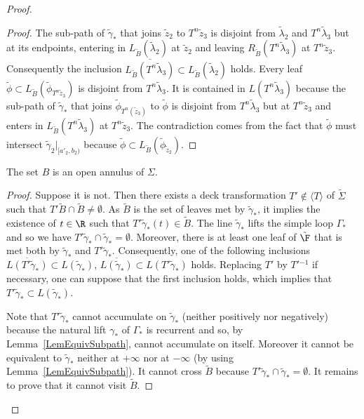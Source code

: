 \begin{proof}
\begin{proof}
The sub-path of $\tilde\gamma_*$ that joins $\tilde z_2$ to $T^n\tilde z_3$ is disjoint from $\tilde\lambda_2$ and $T^n\tilde\lambda_3$ but at its endpoints, entering in $L_{\tilde B}(\tilde\lambda_2)$ at $\tilde z_2$ and leaving $R_{\tilde B}(T^n\tilde\lambda_3)$ at $T^n\tilde z_3$. Consequently the inclusion $\overline{L_{\tilde B}(T^n\tilde\lambda_3)}\subset L_{\tilde B}(\tilde\lambda_2)$ holds. Every leaf $\tilde\phi\subset L_{\tilde B}(\tilde\phi_{T^n\tilde z_3})$ is disjoint from $T^n\tilde\lambda_3$. It is contained in $L(T^n\tilde\lambda_3)$ because the sub-path of $\tilde\gamma_*$ that joins $\tilde\phi_{T^n(\tilde z_3)}$ to $\tilde\phi$ is disjoint from $T^n\tilde\lambda_3$ but at $T^n\tilde z_3$ and enters in $L_{\tilde B}(T^n\tilde\lambda_3)$ at $T^n\tilde z_3$. The contradiction comes from the fact that $\tilde \phi$ must intersect $\tilde\gamma_2\vert_{[a'_2,b_2)}$ because $\tilde\phi\subset L_{\tilde B}(\tilde\phi_{\tilde z_2}).$
\end{proof}

\begin{lemm}\label{Lem:ProjAnnulus}
The set $B$ is an open annulus of $\Sigma$.
\end{lemm}

\begin{proof}
Suppose it is not. Then there exists a deck transformation $T'\notin\langle T\rangle$ of $\tilde\Sigma$ such that $T'\tilde B\cap \tilde B\neq \emptyset$. As $\tilde B$ is the set of leaves met by $\tilde\gamma_*$, it implies the existence of $t\in\R$ such that $T'\tilde\gamma_*(t) \in \tilde B$. The line $\tilde\gamma_*$ lifts the simple loop $\Gamma_*$ and so we have $T'\tilde\gamma_*\cap \tilde\gamma_*=\emptyset$. Moreover, there is at least one leaf of $\tilde{\F}$ that is met both by $\tilde\gamma_*$ and $T'\tilde\gamma_*$. Consequently, one of the following inclusions $\overline{L(T'\tilde\gamma_*)}\subset L(\tilde\gamma_*)$, $\overline{L(\tilde\gamma_*)}\subset L(T'\tilde\gamma_*)$ holds. Replacing $T'$ by $T'{}^{-1}$ if necessary, one can suppose that the first inclusion holds, which implies that $T'\tilde\gamma_*\subset L(\tilde\gamma_*)$.

Note that $T'\tilde\gamma_*$ cannot accumulate on $\tilde\gamma_*$ (neither positively nor negatively) because the natural lift $\gamma_*$ of $\Gamma_*$ is recurrent and so, by Lemma~\ref{LemEquivSubpath}, cannot accumulate on itself. Moreover it cannot be equivalent to $\tilde\gamma_*$ neither at $+\infty$ nor at $-\infty$ (by using Lemma~\ref{LemEquivSubpath}). It cannot cross $\tilde B$ because $T'\tilde\gamma_*\cap \tilde\gamma_*=\emptyset$. It remains to prove that it cannot visit $\tilde B$.


\end{proof}
\end{proof}
